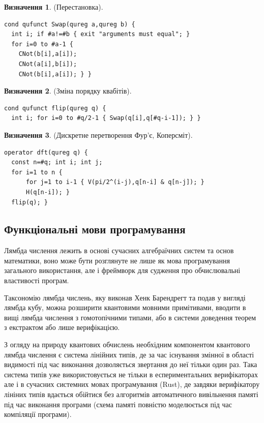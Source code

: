 \documentclass{article}
\theoremstyle{definition}
\newtheorem{definition}{Визначення}
\begin{document}
\begin{definition} (Перестановка).
\begin{lstlisting}
cond qufunct Swap(qureg a,qureg b) {
  int i; if #a!=#b { exit "arguments must equal"; }
  for i=0 to #a-1 {
    CNot(b[i],a[i]);
    CNot(a[i],b[i]);
    CNot(b[i],a[i]); } }
\end{lstlisting}
\end{definition}

\begin{definition} (Зміна порядку квабітів).
\begin{lstlisting}
cond qufunct flip(qureg q) {
  int i; for i=0 to #q/2-1 { Swap(q[i],q[#q-i-1]); } }
\end{lstlisting}
\end{definition}

\begin{definition} (Дискретне перетворення Фур'є, Коперсміт).
\begin{lstlisting}
operator dft(qureg q) {
  const n=#q; int i; int j;
  for i=1 to n {
      for j=1 to i-1 { V(pi/2^(i-j),q[n-i] & q[n-j]); }
      H(q[n-i]); }
  flip(q); }
\end{lstlisting}
\end{definition}

\newpage
\subsection{Функціональні мови програмування}
Лямбда числення лежить в основі сучасних алгебраїчних систем та основ математики\cite{HoTT13},
воно може бути розглянуте не лише як мова програмування загального використання, але і
фреймворк для судження про обчислювальні властивості програм.

Таксономію лямбда числень, яку виконав Хенк Барендрегт та подав у вигляді лямбда кубу\cite{Henk93},
можна розширити квантовими мовними примітивами, вводити в вищі лямбда числення з
гомотопічними типами, або в системи доведення теорем з екстрактом або лише верифікацією.

З огляду на природу квантових обчислень необхідним компонентом квантового лямбда
числення є система лінійних типів, де за час існування змінної в області видимості
під час виконання дозволяється звертання до неї тільки один раз. Така система типів
уже використовується не тільки в еспериментальних верифікаторах але і в сучасних
системних мовах програмування (Rust), де завдяки верифікатору лініних типів
вдається обійтися без алгоритмів автоматичного вивільнення памяті під час
виконання програми (схема памяті повністю моделюється під час компіляції програми).
\end{document}
